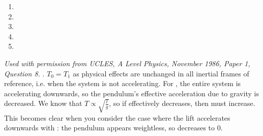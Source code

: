 
\begin{problem}
{ 
\begin{enumerate}
	\item {}
	\item  {}\correct
	\item  {}
	\item  {}
	\item  {}
\end{enumerate}
}
{\textit{Used with permission from UCLES, A Level Physics, November 1986, Paper 1, Question 8.}}
{. $T_0 = T_1$ as physical effects are unchanged in all inertial frames of reference, i.e. when the system is not accelerating. For , the entire system is accelerating downwards, so the pendulum's effective acceleration due to gravity is decreased. We know that $T \propto \sqrt{\frac{l}{g}}$, so if  effectively decreases, then  must increase. This becomes clear when you consider the case where the lift accelerates downwards with : the pendulum appears weightless, so  decreases to 0.
}
\end{problem}